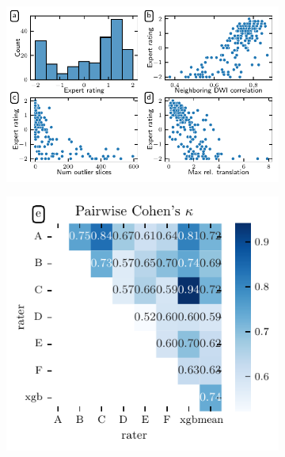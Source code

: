 \documentclass[fleqn,10pt,inline]{wlscirep}
\begin{document}
\begin{figure}[tbp]
    {\label{fig:expert-qc:scatter:hist}}
    {\label{fig:expert-qc:scatter:ndc}}
    {\label{fig:expert-qc:scatter:translation}}
    {\label{fig:expert-qc:scatter:outliers}}
    {\label{fig:expert-qc:irr}}
    \begin{subfigure}{.6\linewidth}
    \centering
    \includegraphics[width=\linewidth]{community-qc/expert-qsiprep-pairplot.pdf}
    \end{subfigure}
    \begin{subfigure}{.4\linewidth}
    \centering
    \includegraphics[width=\linewidth]{community-qc/expert-raters-cohens-kappa.pdf}

\end{subfigure}
\end{figure}
\end{document}
